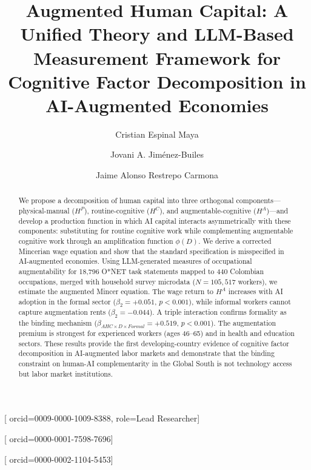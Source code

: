 \documentclass[a4paper,fleqn]{cas-dc}
\begin{document}
\let\WriteBookmarks\relax
\def\floatpagepagefraction{1}
\def\textpagefraction{.001}


\title[mode=title]{Augmented Human Capital: A Unified Theory and LLM-Based Measurement Framework for Cognitive Factor Decomposition in AI-Augmented Economies}

\author[1]{Cristian Espinal Maya}[
  orcid=0009-0000-1009-8388,
  role=Lead Researcher]
\cormark[1]

\author[2]{Jovani A. Jim\'enez-Builes}[
  orcid=0000-0001-7598-7696]

\author[2]{Jaime Alonso Restrepo Carmona}[
  orcid=0000-0002-1104-5453]




\begin{abstract}
We propose a decomposition of human capital into three orthogonal components---physical-manual ($H^P$), routine-cognitive ($H^C$), and augmentable-cognitive ($H^A$)---and develop a production function in which AI capital interacts asymmetrically with these components: substituting for routine cognitive work while complementing augmentable cognitive work through an amplification function $\phi(D)$. We derive a corrected Mincerian wage equation and show that the standard specification is misspecified in AI-augmented economies. Using LLM-generated measures of occupational augmentability for 18,796 O*NET task statements mapped to 440 Colombian occupations, merged with household survey microdata ($N = 105{,}517$ workers), we estimate the augmented Mincer equation. The wage return to $H^A$ increases with AI adoption in the formal sector ($\beta_2 = +0.051$, $p < 0.001$), while informal workers cannot capture augmentation rents ($\beta_2 = -0.044$). A triple interaction confirms formality as the binding mechanism ($\beta_{AHC \times D \times Formal} = +0.519$, $p < 0.001$). The augmentation premium is strongest for experienced workers (ages 46--65) and in health and education sectors. These results provide the first developing-country evidence of cognitive factor decomposition in AI-augmented labor markets and demonstrate that the binding constraint on human-AI complementarity in the Global South is not technology access but labor market institutions.
\end{abstract}
\end{document}
